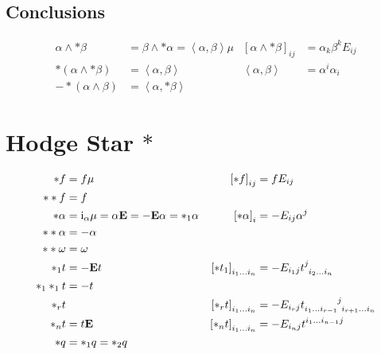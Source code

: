 \documentclass[a4paper,7pt]{scrartcl}
\newcommand{\iup}{\mathrm{i}}
\newcommand{\Eb}{\mathbf{E}}
\begin{document}
\subsection{Conclusions}
  \begin{align*}
    \alpha \wedge *\beta &= \beta \wedge *\alpha = \left\langle \alpha,\beta \right\rangle\mu
            & \left[  \alpha \wedge *\beta \right]_{ij} &= \alpha_{k}\beta^{k}E_{ij} \\
    *\left( \alpha \wedge *\beta \right) &= \left\langle \alpha, \beta \right\rangle
                            & \left\langle \alpha, \beta \right\rangle &= \alpha^{i}\alpha_{i} \\
    -*\left( \alpha \wedge \beta \right) &= \left\langle \alpha, *\beta \right\rangle
  \end{align*}

\section{Hodge Star \( *\)}
\begin{align*}
  *f &= f\mu 
            &\left[ *f \right]_{ij} &= fE_{ij} \\
  **f &= f\\
  *\alpha &= \iup_{\alpha}\mu = \alpha\Eb = -\Eb\alpha = *_{1}\alpha
              &\left[ *\alpha \right]_{i} &= -E_{ij}\alpha^{j}\\
  **\alpha &= -\alpha \\
  **\omega &= \omega \\
  *_{1}t &= -\Eb t
          & \left[ *t_{1} \right]_{i_{1}\ldots i_{n}} &= -E_{i_{1}j}\tensor{t}{^{j}_{i_{2}\ldots i_{n}}} \\
  *_{1}*_{1}t &= -t\\
  *_{r}t && \left[ *_{r}t \right]_{i_{1}\ldots i_{n}} &= -E_{i_{r}j}\tensor{t}{_{i_{1}\ldots i_{r-1}}^{j}_{i_{r+1}\ldots i_{n}}} \\
  *_{n}t &= t\Eb
          & \left[ *_{n}t \right]_{i_{1}\ldots i_{n}} &= -E_{i_{n}j}\tensor{t}{^{i_{1}\ldots i_{n-1}}^{j}} \\
  *q &= *_{1} q = *_{2} q
\end{align*}
\end{document}
